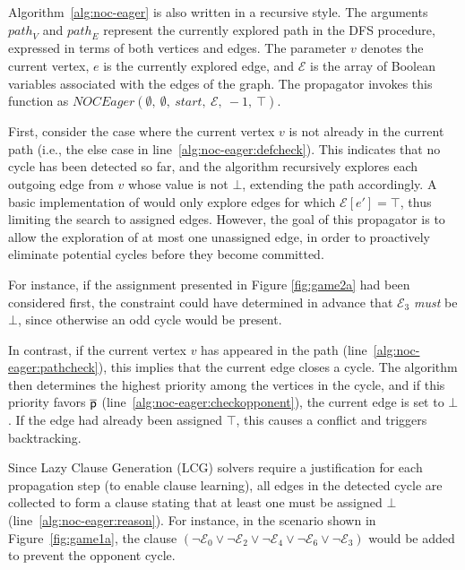 \documentclass{article}
\begin{document}
Algorithm~\ref{alg:noc-eager} is also written in a recursive style. The arguments $\mathit{path}_V$ and $\mathit{path}_E$ represent the currently explored path in the DFS procedure, expressed in terms of both vertices and edges. The parameter $v$ denotes the current vertex, $e$ is the currently explored edge, and $\mathcal{E}$ is the array of Boolean variables associated with the edges of the graph. The \noc propagator invokes this function as $\textit{NOCEager}(\emptyset,\ \emptyset,\ start,\ \mathcal{E},\ -1,\ \top)$.

First, consider the case where the current vertex $v$ is not already in the current path (i.e., the else case in line~\ref{alg:noc-eager:defcheck}). This indicates that no cycle has been detected so far, and the algorithm recursively explores each outgoing edge from $v$ whose value is not $\bot$, extending the path accordingly. A basic implementation of \noceager would only explore edges for which $\mathcal{E}[e'] = \top$, thus limiting the search to assigned edges. However, the goal of this propagator is to allow the exploration of at most one unassigned edge, in order to proactively eliminate potential cycles before they become committed.

For instance, if the assignment presented in Figure \ref{fig:game2a} had been considered first, the constraint could have determined in advance that $\mathcal{E}_3$ \textit{must} be $\bot$, since otherwise an odd cycle would be present.

In contrast, if the current vertex $v$ has appeared in the path (line~\ref{alg:noc-eager:pathcheck}), this implies that the current edge closes a cycle. The algorithm then determines the highest priority among the vertices in the cycle, and if this priority favors $\opponent$ (line~\ref{alg:noc-eager:checkopponent}), the current edge is set to $\bot$. If the edge had already been assigned $\top$, this causes a conflict and triggers backtracking.

Since Lazy Clause Generation (LCG) solvers require a justification for each propagation step (to enable clause learning), all edges in the detected cycle are collected to form a clause stating that at least one must be assigned $\bot$ (line~\ref{alg:noc-eager:reason}). For instance, in the scenario shown in Figure~\ref{fig:game1a}, the clause $(\neg \mathcal{E}_0 \vee \neg \mathcal{E}_2 \vee \neg \mathcal{E}_4 \vee \neg \mathcal{E}_6 \vee \neg \mathcal{E}_3)$ would be added to prevent the opponent cycle.
\end{document}
